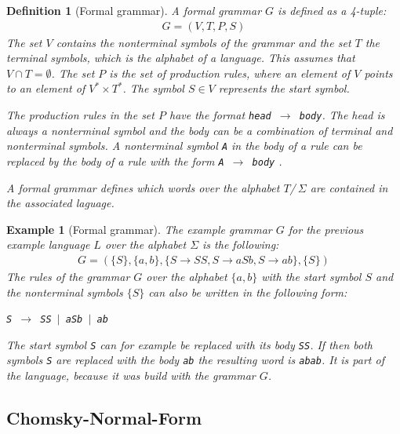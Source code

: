 \documentclass[a4paper, 11pt]{article}
\newtheorem*{example*}{Example}
\newtheorem*{definition*}{Definition}
\begin{document}
\begin{definition*}[Formal grammar]
A formal grammar $G$ is defined as a 4-tuple:
\begin{align*}
G = (V, T, P, S)
\end{align*}
The set $V$ contains the nonterminal symbols of the grammar and the set $T$ the terminal symbols, which is the alphabet of a language. This assumes that $V \cap T = \emptyset$. The set $P$ is the set of production rules, where an element of $V$ points to an element of $V^* \times T^*$. The symbol $S \in V$ represents the start symbol. 

The production rules in the set $P$ have the format \texttt{head $\rightarrow$ body}. The head is always a nonterminal symbol and the body can be a combination of terminal and nonterminal symbols. A nonterminal symbol \texttt{A} in the body of a rule can be replaced by the body of a rule with the form \texttt{A $\rightarrow$ body} \cite{LS_Ulm}.


A formal grammar defines which words over the alphabet $T$/$ \ \Sigma$ are contained in the associated laguage.
\end{definition*}

\begin{example*}[Formal grammar]
The example grammar $G$ for the previous example language $L$ over the alphabet $\Sigma$ is the following:
\begin{align*}
G = (\{S\}, \{ a, b \}, \{ S \rightarrow SS, S \rightarrow  aSb, S \rightarrow ab \},  \{ S \})
\end{align*}
The rules of the grammar $G$ over the alphabet $\{a, b\}$ with the start symbol $S$ and the nonterminal symbols $\{ S \}$ can also be written in the following form:
\begin{center}
\texttt{S $\rightarrow$ SS $\mid$  aSb $\mid$ ab}
\end{center}
The start symbol \texttt{S} can for example be replaced with its body \texttt{SS}. If then both symbols \texttt{S} are replaced with the body \texttt{ab} the resulting word is \texttt{abab}. It is part of the language, because it was build with the grammar $G$.
\end{example*}


\subsection{Chomsky-Normal-Form}
\label{cnf}
\end{document}
